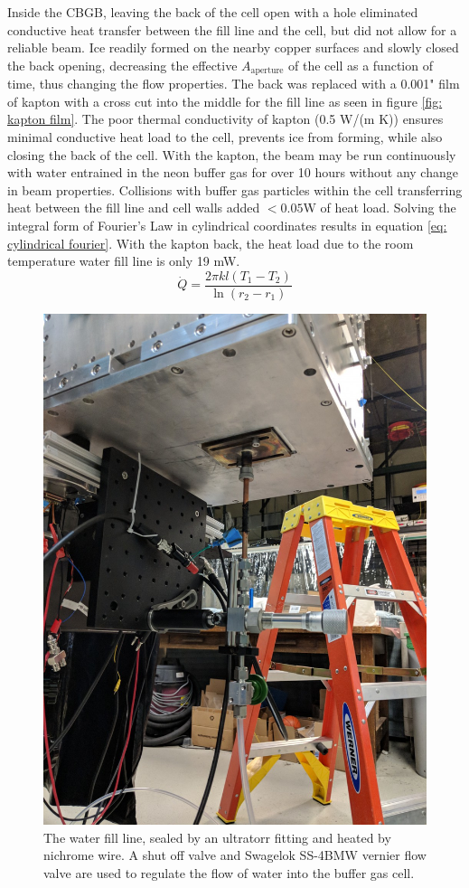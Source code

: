 Inside the CBGB, leaving the back of the cell open with a hole eliminated conductive heat transfer between the fill line and the cell, but did not allow for a reliable beam. Ice readily formed on the nearby copper surfaces and slowly closed the back opening, decreasing the effective $A_{\mathrm{aperture}}$ of the cell as a function of time, thus changing the flow properties. The back was replaced with a 0.001" film of kapton with a cross cut into the middle for the fill line as seen in figure \ref{fig: kapton film}. The poor thermal conductivity of kapton (0.5 W/(m K)) ensures minimal conductive heat load to the cell, prevents ice from forming, while also closing the back of the cell. With the kapton, the beam may be run continuously with water entrained in the neon buffer gas for over 10 hours without any change in beam properties. Collisions with buffer gas particles within the cell transferring heat between the fill line and cell walls added $<0.05$W of heat load. Solving the integral form of Fourier's Law in cylindrical coordinates results in equation \ref{eq: cylindrical fourier}. With the kapton back, the heat load due to the room temperature water fill line is only 19 mW.
\begin{equation}
	\dot{Q} = \frac{2 \pi k l (T_1 - T_2)}{\ln(r_2 - r_1)}
	\label{eq: cylindrical fourier}
\end{equation}

\begin{figure}[H]
	\centering
	\includegraphics[width=.5\textwidth]{images/CBGB_water_fill_outside.jpg}
	\caption{The water fill line, sealed by an ultratorr fitting and heated by nichrome wire. A shut off valve and Swagelok SS-4BMW vernier flow valve are used to regulate the flow of water into the buffer gas cell.}
	\label{fig: water fill bottom}
\end{figure}

